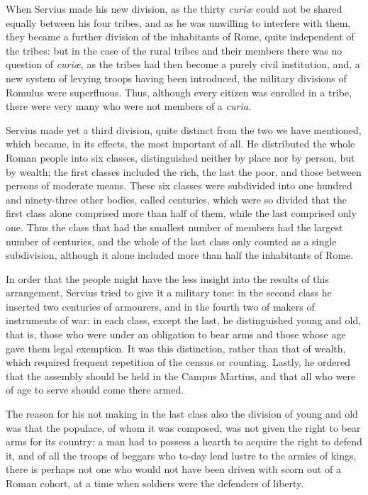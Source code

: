 \documentclass[12pt]{book}
\begin{document}
When Servius made his new division, as the thirty \textit{curiæ} could not be shared equally between his four tribes, and as he was unwilling to interfere with them, they became a further division of the inhabitants of Rome, quite independent of the tribes: but in the case of the rural tribes and their members there was no question of \textit{curiæ}, as the tribes had then become a purely civil institution, and, a new system of levying troops having been introduced, the military divisions of Romulus were superfluous. Thus, although every citizen was enrolled in a tribe, there were very many who were not members of a \textit{curia}.

Servius made yet a third division, quite distinct from the two we have mentioned, which became, in its effects, the most important of all. He distributed the whole Roman people into six classes, distinguished neither by place nor by person, but by wealth; the first classes included the rich, the last the poor, and those between persons of moderate means. These six classes were subdivided into one hundred and ninety-three other bodies, called centuries, which were so divided that the first class alone comprised more than half of them, while the last comprised only one. Thus the class that had the smallest number of members had the largest number of centuries, and the whole of the last class only counted as a single subdivision, although it alone included more than half the inhabitants of Rome.

In order that the people might have the less insight into the results of this arrangement, Servius tried to give it a military tone: in the second class he inserted two centuries of armourers, and in the fourth two of makers of instruments of war: in each class, except the last, he distinguished young and old, that is, those who were under an obligation to bear arms and those whose age gave them legal exemption. It was this distinction, rather than that of wealth, which required frequent repetition of the census or counting. Lastly, he ordered that the assembly should be held in the Campus Martius, and that all who were of age to serve should come there armed.

The reason for his not making in the last class also the division of young and old was that the populace, of whom it was composed, was not given the right to bear arms for its country: a man had to possess a hearth to acquire the right to defend it, and of all the troops of beggars who to-day lend lustre to the armies of kings, there is perhaps not one who would not have been driven with scorn out of a Roman cohort, at a time when soldiers were the defenders of liberty.
\end{document}
